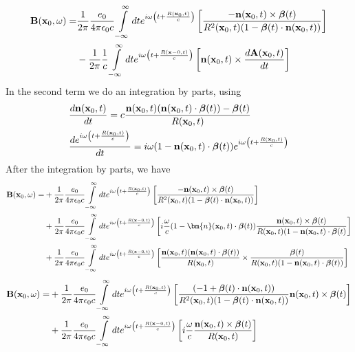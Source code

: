 \begin{align}
    {\bf B}({\bf x}_0,\omega)= & \frac1{2\pi}\frac{e_0}{4\pi\epsilon_0c}\int\limits_{-\infty}^{\infty}dt e^{i\omega \left(t+\frac{R({\bf x}_0,t)}c\right)}\left[\frac{-{\bf n}({\bf x}_0,t)\times{\boldsymbol{\beta}}(t)}{R^2({\bf x}_0,t)(1-{\boldsymbol{\beta}}(t)\cdot{\bf n}({\bf x}_0,t))}\right] \nonumber \\
                               & -\frac1{2\pi} \frac1c\int\limits_{-\infty}^{\infty}dt e^{i\omega \left(t+\frac{R({\bf x}-0,t)}c\right)}\left[{{\bf n}({\bf x}_0,t)}\times\frac{d{\bf A}({\bf x}_0,t)}{dt}\right]
\end{align}
In the second term we do an integration by parts, using
\begin{align}
     & \frac{d{\bf n}({\bf x}_0,t)}{dt}=c\frac{{\bf n}({\bf x}_0,t)({\bf n}({\bf x}_0,t)\cdot{\boldsymbol{\beta}}(t))-{\boldsymbol{\beta}}(t)}{R({\bf x}_0,t)}                    \\
     & \frac{de^{i\omega \left(t+\frac{R({\bf x}_0,t)}c\right)}}{dt}=i\omega(1-{\bf n}({\bf x}_0,t)\cdot{\boldsymbol{\beta}}(t))e^{i\omega \left(t+\frac{R({\bf x}_0,t)}c\right)}
\end{align}
After the integration by parts, we have
\begin{align}
    {\bf B}({\bf x}_0,\omega)= & +\frac1{2\pi}\frac{e_0}{4\pi\epsilon_0c}\int\limits_{-\infty}^{\infty}dt e^{i\omega \left(t+\frac{R({\bf x}_0,t)}c\right)}\left[\frac{-{\bf n}({\bf x}_0,t)\times{\boldsymbol{\beta}}(t)}{R^2({\bf x}_0,t)(1-{\boldsymbol{\beta}}(t)\cdot{\bf n}({\bf x}_0,t))}\right]                   \nonumber                                                \\
                               & +\frac1{2\pi} \frac{e_0}{4\pi\epsilon_0c}\int\limits_{-\infty}^{\infty}dt e^{i\omega \left(t+\frac{R({\bf x}-0,t)}c\right)}\left[i\frac{\omega}c(1-{\bm{n}}({\bf x}_0,t)\cdot{\boldsymbol{\beta}}(t))\frac{{\bf  n}({\bf x}_0,t)\times{\boldsymbol{\beta}}(t)}{R({\bf x}_0,t)(1-{\bf n}({\bf x}_0,t)\cdot{\boldsymbol{\beta}}(t)}\right]\nonumber \\
                               & +\frac1{2\pi} \frac{e_0}{4\pi\epsilon_0c}\int\limits_{-\infty}^{\infty}dt e^{i\omega \left(t+\frac{R({\bf x}-0,t)}c\right)}\left[\frac{{\bf n}({\bf x}_0,t)({\bf n}({\bf x}_0,t)\cdot{\boldsymbol{\beta}}(t))}{R({\bf x}_0,t)}\times\frac{{\boldsymbol{\beta}}(t)}{R({\bf x}_0,t)(1-{\bf n}({\bf x}_0,t)\cdot{\boldsymbol{\beta}}(t))}\right]
\end{align}
\begin{align}
    {\bf B}({\bf x}_0,\omega)= & +\frac1{2\pi}\frac{e_0}{4\pi\epsilon_0c}\int\limits_{-\infty}^{\infty}dt e^{i\omega \left(t+\frac{R({\bf x}_0,t)}c\right)}\left[\frac{(-1+{\boldsymbol{\beta}}(t)\cdot{\bf n}({\bf x}_0,t))}{R^2({\bf x}_0,t)(1-{\boldsymbol{\beta}}(t)\cdot{\bf n}({\bf x}_0,t))}{\bf n}({\bf x}_0,t)\times{\boldsymbol{\beta}}(t)\right] \nonumber \\
                               & +\frac1{2\pi} \frac{e_0}{4\pi\epsilon_0c}\int\limits_{-\infty}^{\infty}dt e^{i\omega \left(t+\frac{R({\bf x}-0,t)}c\right)}\left[i\frac{\omega}c\frac{{\bf  n}({\bf x}_0,t)\times{\boldsymbol{\beta}}(t)}{R({\bf x}_0,t)}\right]
\end{align}
